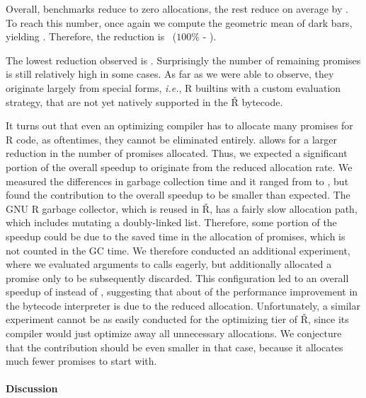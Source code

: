 \documentclass[review,creen,acmsmall]{acmart}
\renewcommand{\Rsh}{{\sf\v R}\xspace}
\newcommand{\ie}{\emph{i.e.},\xspace}
\begin{document}
Overall, \promiseAlocationReductionRshStrictToZero benchmarks reduce to zero
allocations, the rest reduce on average by
\promiseAlocationReductionGnurRshStrict. To reach this number, once again we
compute the geometric mean of dark bars, yielding
\promiseAllocatioGnurRshStrict. Therefore, the reduction is
~\promiseAlocationReductionGnurRshStrict ({$100\%$\xspace} -
\promiseAllocatioGnurRshStrict).

The lowest reduction observed is \promiseAlocationReductionGnurRshStrictMin.
Surprisingly the number of remaining promises is still relatively high in some
cases. As far as we were able to observe, they originate largely from special
forms, \ie R builtins with a custom evaluation strategy, that are not yet
natively supported in the \Rsh bytecode.

It turns out that even an optimizing compiler has to allocate many promises for
R code, as oftentimes, they cannot be eliminated entirely. \rshstrict allows for
a larger reduction in the number of promises allocated. Thus, we expected a
significant portion of the overall speedup to originate from the reduced
allocation rate. We measured the differences in garbage collection time and it
ranged from \speedupGCRshStrictMin to \speedupGCRshStrictMax, but found the
contribution to the overall speedup to be smaller than expected. The GNU R
garbage collector, which is reused in \Rsh, has a fairly slow allocation path,
which includes mutating a doubly-linked list. Therefore, some portion of the
speedup could be due to the saved time in the allocation of promises, which is
not counted in the GC time. We therefore conducted an additional experiment,
where we evaluated arguments to calls eagerly, but additionally allocated a
promise only to be subsequently discarded. This configuration led to an overall
speedup of \speedupBCRshStrictAlloc instead of \speedupBCRshStrict, suggesting
that about \speedupDueToReducedGC of the performance improvement in the bytecode
interpreter is due to the reduced allocation. Unfortunately, a similar
experiment cannot be as easily conducted for the optimizing tier of \Rsh, since
its compiler would just optimize away all unnecessary allocations. We conjecture
that the contribution should be even smaller in that case, because it allocates
much fewer promises to start with.

\paragraph{Discussion}
\end{document}
